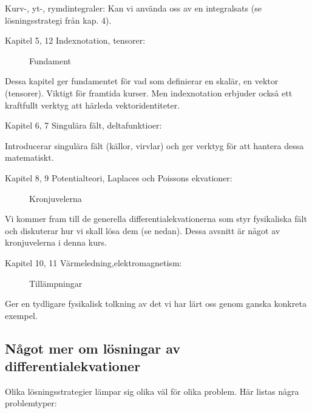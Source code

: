 \documentclass[%
oneside,                 %
final,                   %
10pt]{article}
\begin{document}
\noindent
Kurv-, yt-, rymdintegraler: Kan vi använda oss av en integralsats (se lösningsstrategi från kap. 4).
\begin{description}
 \item[Kapitel 5, 12 Indexnotation, tensorer:] 
   Fundament
\end{description}

\noindent
 Dessa kapitel ger fundamentet för vad som definierar en skalär, 
 en vektor (tensorer). Viktigt för framtida kurser. Men indexnotation 
 erbjuder också ett kraftfullt verktyg att härleda vektoridentiteter.
\begin{description}
 \item[Kapitel 6, 7 Singulära fält, deltafunktioer:] 
\end{description}

\noindent
 Introducerar singulära fält (källor, virvlar) och ger verktyg för 
 att hantera dessa matematiskt.
\begin{description}
 \item[Kapitel 8, 9 Potentialteori, Laplaces och Poissons ekvationer:] 
   Kronjuvelerna
\end{description}

\noindent
 Vi kommer fram till de generella differentialekvationerna som styr fysikaliska 
 fält och diskuterar hur vi skall lösa dem (se nedan). Dessa avsnitt är något 
 av kronjuvelerna i denna kurs.
\begin{description}
 \item[Kapitel 10, 11 Värmeledning,elektromagnetism:] 
   Tillämpningar
\end{description}

\noindent
 Ger en tydligare fysikalisk tolkning av det vi har lärt oss genom ganska konkreta exempel.

\subsection{Något mer om lösningar av differentialekvationer}
Olika lösningsstrategier lämpar sig olika väl för olika problem. Här listas några problemtyper:
\end{document}
